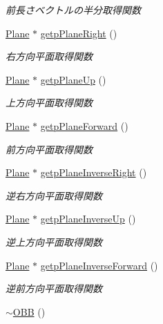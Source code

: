\begin{DoxyCompactItemize}
\begin{DoxyCompactList}\small\item\em 前長さベクトルの半分取得関数 \end{DoxyCompactList}\item 
\mbox{\hyperlink{class_plane}{Plane}} $\ast$ \mbox{\hyperlink{class_o_b_b_a1298de54379efa036a1b85bbec1be814}{getp\+Plane\+Right}} ()
\begin{DoxyCompactList}\small\item\em 右方向平面取得関数 \end{DoxyCompactList}\item 
\mbox{\hyperlink{class_plane}{Plane}} $\ast$ \mbox{\hyperlink{class_o_b_b_a99c9311cfe163c7691852af267f28b79}{getp\+Plane\+Up}} ()
\begin{DoxyCompactList}\small\item\em 上方向平面取得関数 \end{DoxyCompactList}\item 
\mbox{\hyperlink{class_plane}{Plane}} $\ast$ \mbox{\hyperlink{class_o_b_b_abd61bbe178f1331e4ed4eaef760b6c7a}{getp\+Plane\+Forward}} ()
\begin{DoxyCompactList}\small\item\em 前方向平面取得関数 \end{DoxyCompactList}\item 
\mbox{\hyperlink{class_plane}{Plane}} $\ast$ \mbox{\hyperlink{class_o_b_b_ae00c6a4fc8db4f51358d38b5c2a65a46}{getp\+Plane\+Inverse\+Right}} ()
\begin{DoxyCompactList}\small\item\em 逆右方向平面取得関数 \end{DoxyCompactList}\item 
\mbox{\hyperlink{class_plane}{Plane}} $\ast$ \mbox{\hyperlink{class_o_b_b_a77460cf252dfd060d4376451b6f1ad1e}{getp\+Plane\+Inverse\+Up}} ()
\begin{DoxyCompactList}\small\item\em 逆上方向平面取得関数 \end{DoxyCompactList}\item 
\mbox{\hyperlink{class_plane}{Plane}} $\ast$ \mbox{\hyperlink{class_o_b_b_a276db72b9b373f2fe15be1113c048fb2}{getp\+Plane\+Inverse\+Forward}} ()
\begin{DoxyCompactList}\small\item\em 逆前方向平面取得関数 \end{DoxyCompactList}\item 
\mbox{\hyperlink{class_o_b_b_aa95ab77e0c88faf68db43ed7f6b0ea5a}{$\sim$\+O\+BB}} ()

\end{DoxyCompactItemize}
